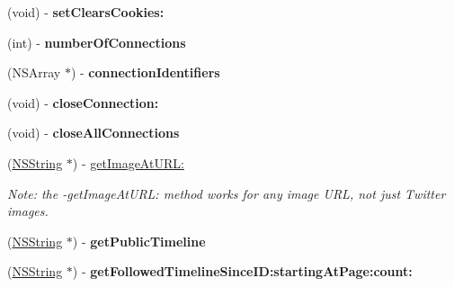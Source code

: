 \begin{DoxyCompactItemize}
\item 
\hypertarget{interface_m_g_twitter_engine_a63bb38136c8efb286ae729d0ecdc0cc9}{
(void) -\/ {\bfseries set\-Clears\-Cookies\-:}}
\label{interface_m_g_twitter_engine_a63bb38136c8efb286ae729d0ecdc0cc9}

\item 
\hypertarget{interface_m_g_twitter_engine_a1f651b8109cc99e3186e3deef1392d3e}{
(int) -\/ {\bfseries number\-Of\-Connections}}
\label{interface_m_g_twitter_engine_a1f651b8109cc99e3186e3deef1392d3e}

\item 
\hypertarget{interface_m_g_twitter_engine_a3adad631ab6cf30a5868cf14f28e7d5f}{
(\-N\-S\-Array $\ast$) -\/ {\bfseries connection\-Identifiers}}
\label{interface_m_g_twitter_engine_a3adad631ab6cf30a5868cf14f28e7d5f}

\item 
\hypertarget{interface_m_g_twitter_engine_a4beaf602b3bd433ec2e690eecead4457}{
(void) -\/ {\bfseries close\-Connection\-:}}
\label{interface_m_g_twitter_engine_a4beaf602b3bd433ec2e690eecead4457}

\item 
\hypertarget{interface_m_g_twitter_engine_af4374d16b5f4a31450772ab90eca110b}{
(void) -\/ {\bfseries close\-All\-Connections}}
\label{interface_m_g_twitter_engine_af4374d16b5f4a31450772ab90eca110b}

\item 
\hypertarget{interface_m_g_twitter_engine_aa96adc9abc7d1f07330891a06478f977}{
(\hyperlink{class_n_s_string}{\-N\-S\-String} $\ast$) -\/ \hyperlink{interface_m_g_twitter_engine_aa96adc9abc7d1f07330891a06478f977}{get\-Image\-At\-U\-R\-L\-:}}
\label{interface_m_g_twitter_engine_aa96adc9abc7d1f07330891a06478f977}

\begin{DoxyCompactList}\small\item\em \-Note\-: the -\/get\-Image\-At\-U\-R\-L\-: method works for any image \-U\-R\-L, not just \-Twitter images. \end{DoxyCompactList}\item 
\hypertarget{interface_m_g_twitter_engine_a527d97598a9c34af1f667260a4175173}{
(\hyperlink{class_n_s_string}{\-N\-S\-String} $\ast$) -\/ {\bfseries get\-Public\-Timeline}}
\label{interface_m_g_twitter_engine_a527d97598a9c34af1f667260a4175173}

\item 
\hypertarget{interface_m_g_twitter_engine_a8a40d534561bffabb34490c6e2dcc85e}{
(\hyperlink{class_n_s_string}{\-N\-S\-String} $\ast$) -\/ {\bfseries get\-Followed\-Timeline\-Since\-I\-D\-:starting\-At\-Page\-:count\-:}}
\label{interface_m_g_twitter_engine_a8a40d534561bffabb34490c6e2dcc85e}


\end{DoxyCompactItemize}
